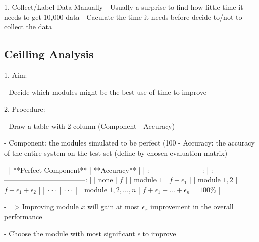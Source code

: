 1. Collect/Label Data Manually
- Usually a surprise to find how little time it needs to get 10,000 data
- Caculate the time it needs before decide to/not to collect the data

\subsection{Ceilling Analysis}

1. Aim:

- Decide which modules might be the best use of time to improve

2. Procedure:

- Draw a table with 2 column (Component - Accuracy)

- Component: the modules simulated to be perfect (100%
- Accuracy: the accuracy of the entire system on the test set (define by chosen evaluation matrix)

- |   **Perfect Component**   |             **Accuracy**              |
| :-----------------------: | :-----------------------------------: |
|           none            |                  $f$                  |
|        module $1$         |            $f+\epsilon_1$             |
|       module $1,2$        |       $f+\epsilon_1+\epsilon_2$       |
| $\cdot \\ \cdot \\ \cdot$ |       $\cdot \\ \cdot \\ \cdot$       |
|    module $1,2,...,n$     | $f+\epsilon_1+...+\epsilon_n = 100\%$ |

- => Improving module $x$ will gain at most $\epsilon_x$ improvement in the overall performance

- Choose the module with most significant $\epsilon$ to improve









